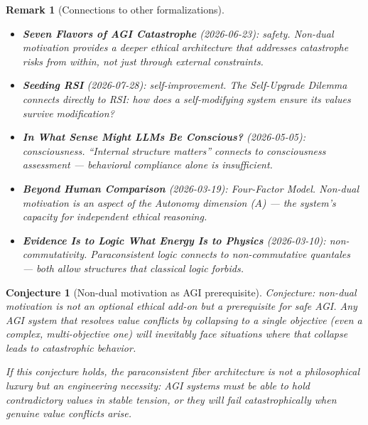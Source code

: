 \documentclass[11pt,a4paper]{article}
\newtheorem{remark}[definition]{Remark}
\newtheorem{conjecture}[definition]{Conjecture}
\begin{document}
\begin{remark}[Connections to other formalizations]
\begin{itemize}
\item \textbf{Seven Flavors of AGI Catastrophe} (2026-06-23): safety.
  Non-dual motivation provides a deeper ethical architecture that addresses
  catastrophe risks from within, not just through external constraints.
\item \textbf{Seeding RSI} (2026-07-28): self-improvement. The
  Self-Upgrade Dilemma connects directly to RSI: how does a self-modifying
  system ensure its values survive modification?
\item \textbf{In What Sense Might LLMs Be Conscious?} (2026-05-05):
  consciousness. ``Internal structure matters'' connects to consciousness
  assessment --- behavioral compliance alone is insufficient.
\item \textbf{Beyond Human Comparison} (2026-03-19): Four-Factor Model.
  Non-dual motivation is an aspect of the Autonomy dimension ($A$) ---
  the system's capacity for independent ethical reasoning.
\item \textbf{Evidence Is to Logic What Energy Is to Physics} (2026-03-10):
  non-commutativity. Paraconsistent logic connects to non-commutative
  quantales --- both allow structures that classical logic forbids.
\end{itemize}
\end{remark}

\begin{conjecture}[Non-dual motivation as AGI prerequisite]
Conjecture: non-dual motivation is not an optional ethical add-on but a
prerequisite for safe AGI. Any AGI system that resolves value conflicts
by collapsing to a single objective (even a complex, multi-objective
one) will inevitably face situations where that collapse leads to
catastrophic behavior.

If this conjecture holds, the paraconsistent fiber architecture is
not a philosophical luxury but an engineering necessity: AGI systems
must be able to hold contradictory values in stable tension, or they
will fail catastrophically when genuine value conflicts arise.
\end{conjecture}
\end{document}
